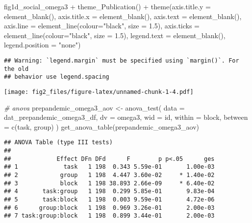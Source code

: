 \documentclass[
]{article}
\newenvironment{Shaded}{\begin{snugshade}}{\end{snugshade}}
\newcommand{\AttributeTok}[1]{\textcolor[rgb]{0.77,0.63,0.00}{#1}}
\newcommand{\CommentTok}[1]{\textcolor[rgb]{0.56,0.35,0.01}{\textit{#1}}}
\newcommand{\FloatTok}[1]{\textcolor[rgb]{0.00,0.00,0.81}{#1}}
\newcommand{\FunctionTok}[1]{\textcolor[rgb]{0.00,0.00,0.00}{#1}}
\newcommand{\NormalTok}[1]{#1}
\newcommand{\OtherTok}[1]{\textcolor[rgb]{0.56,0.35,0.01}{#1}}
\newcommand{\SpecialCharTok}[1]{\textcolor[rgb]{0.00,0.00,0.00}{#1}}
\newcommand{\StringTok}[1]{\textcolor[rgb]{0.31,0.60,0.02}{#1}}
\begin{document}
\begin{Shaded}
\begin{Highlighting}[]
\NormalTok{fig1d\_social\_omega3 }\SpecialCharTok{+} \FunctionTok{theme\_Publication}\NormalTok{() }\SpecialCharTok{+} \FunctionTok{theme}\NormalTok{(}\AttributeTok{axis.title.y =} \FunctionTok{element\_blank}\NormalTok{(),}
                                                  \AttributeTok{axis.title.x =} \FunctionTok{element\_blank}\NormalTok{(),}
                                                  \AttributeTok{axis.text =} \FunctionTok{element\_blank}\NormalTok{(), }
                                                  \AttributeTok{axis.line =} \FunctionTok{element\_line}\NormalTok{(}\AttributeTok{colour=}\StringTok{"black"}\NormalTok{, }\AttributeTok{size =} \FloatTok{1.5}\NormalTok{),}
                                                  \AttributeTok{axis.ticks =} \FunctionTok{element\_line}\NormalTok{(}\AttributeTok{colour=}\StringTok{"black"}\NormalTok{, }\AttributeTok{size =} \FloatTok{1.5}\NormalTok{),}
                                                  \AttributeTok{legend.text =} \FunctionTok{element\_blank}\NormalTok{(),}
                                                  \AttributeTok{legend.position =} \StringTok{"none"}\NormalTok{)}
\end{Highlighting}
\end{Shaded}

\begin{verbatim}
## Warning: `legend.margin` must be specified using `margin()`. For the old
## behavior use legend.spacing
\end{verbatim}

\texttt{[image: fig2\_files/figure-latex/unnamed-chunk-1-4.pdf]}

\begin{Shaded}
\begin{Highlighting}[]
\CommentTok{\# anova}
\NormalTok{prepandemic\_omega3\_aov }\OtherTok{\textless{}{-}} \FunctionTok{anova\_test}\NormalTok{(}
  \AttributeTok{data =}\NormalTok{ dat\_prepandemic\_omega3\_df, }\AttributeTok{dv =}\NormalTok{ omega3, }\AttributeTok{wid =}\NormalTok{ id,}
  \AttributeTok{within =}\NormalTok{ block, }\AttributeTok{between =} \FunctionTok{c}\NormalTok{(task, group)}
\NormalTok{)}
\FunctionTok{get\_anova\_table}\NormalTok{(prepandemic\_omega3\_aov)}
\end{Highlighting}
\end{Shaded}

\begin{verbatim}
## ANOVA Table (type III tests)
## 
##             Effect DFn DFd      F        p p<.05      ges
## 1             task   1 198  0.343 5.59e-01       1.00e-03
## 2            group   1 198  4.447 3.60e-02     * 1.40e-02
## 3            block   1 198 38.893 2.66e-09     * 6.40e-02
## 4       task:group   1 198  0.299 5.85e-01       9.83e-04
## 5       task:block   1 198  0.003 9.59e-01       4.72e-06
## 6      group:block   1 198  0.969 3.26e-01       2.00e-03
## 7 task:group:block   1 198  0.899 3.44e-01       2.00e-03
\end{verbatim}
\end{document}
